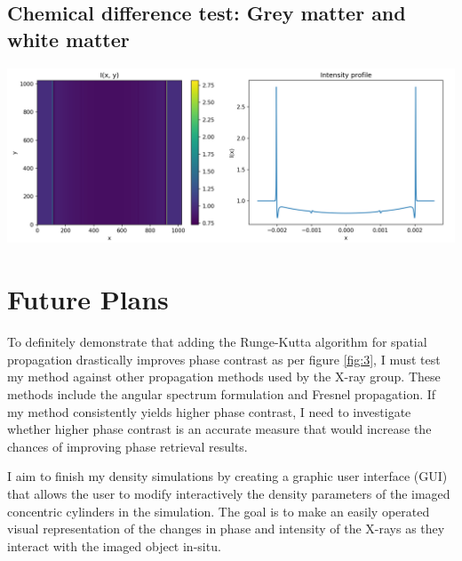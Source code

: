 \documentclass[9pt, a4paper]{article}
\newenvironment{Figure}
    {\par\medskip\noindent\minipage{\linewidth}}
    {\endminipage\par\medskip}
\begin{document}
\subsection{Chemical difference test: Grey matter and white matter}
\begin{Figure}\label{fig:7}
\centering
\includegraphics[width=\linewidth]{optimistic_case.pdf}
\end{Figure}

\section{Future Plans}

To definitely demonstrate that adding the Runge-Kutta algorithm for spatial propagation drastically improves phase contrast as per figure \ref{fig:3}, I must test my method against other propagation methods used by the X-ray group. These methods include the angular spectrum formulation and Fresnel propagation. If my method consistently yields higher phase contrast, I need to investigate whether higher phase contrast is an accurate measure that would increase the chances of improving phase retrieval results.

I aim to finish my density simulations by creating a graphic user interface (GUI) that allows the user to modify interactively the density parameters of the imaged concentric cylinders in the simulation. The goal is to make an easily operated visual representation of the changes in phase and intensity of the X-rays as they interact with the imaged object in-situ.
\end{document}
